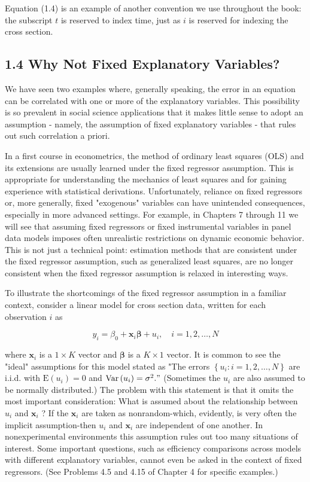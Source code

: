 \documentclass[10pt]{article}
\begin{document}
Equation (1.4) is an example of another convention we use throughout the book: the subscript $t$ is reserved to index time, just as $i$ is reserved for indexing the cross section.

\subsection*{1.4 Why Not Fixed Explanatory Variables?}
We have seen two examples where, generally speaking, the error in an equation can be correlated with one or more of the explanatory variables. This possibility is so prevalent in social science applications that it makes little sense to adopt an assumption - namely, the assumption of fixed explanatory variables - that rules out such correlation a priori.

In a first course in econometrics, the method of ordinary least squares (OLS) and its extensions are usually learned under the fixed regressor assumption. This is appropriate for understanding the mechanics of least squares and for gaining experience with statistical derivations. Unfortunately, reliance on fixed regressors or, more generally, fixed "exogenous" variables can have unintended consequences, especially in more advanced settings. For example, in Chapters 7 through 11 we will see that assuming fixed regressors or fixed instrumental variables in panel data models imposes often unrealistic restrictions on dynamic economic behavior. This is not just a technical point: estimation methods that are consistent under the fixed regressor assumption, such as generalized least squares, are no longer consistent when the fixed regressor assumption is relaxed in interesting ways.

To illustrate the shortcomings of the fixed regressor assumption in a familiar context, consider a linear model for cross section data, written for each observation $i$ as


\begin{equation*}
y_{i}=\beta_{0}+\mathbf{x}_{i} \boldsymbol{\beta}+u_{i}, \quad i=1,2, \ldots, N \tag{1.5}
\end{equation*}


where $\mathbf{x}_{i}$ is a $1 \times K$ vector and $\boldsymbol{\beta}$ is a $K \times 1$ vector. It is common to see the "ideal" assumptions for this model stated as "The errors $\left\{u_{i}: i=1,2, \ldots, N\right\}$ are i.i.d. with $\mathrm{E}\left(u_{i}\right)=0$ and $\operatorname{Var}\left(u_{i}\right)=\sigma^{2} . "$ (Sometimes the $u_{i}$ are also assumed to be normally distributed.) The problem with this statement is that it omits the most important consideration: What is assumed about the relationship between $u_{i}$ and $\mathbf{x}_{i}$ ? If the $\mathbf{x}_{i}$ are taken as nonrandom-which, evidently, is very often the implicit assumption-then $u_{i}$ and $\mathbf{x}_{i}$ are independent of one another. In nonexperimental environments this assumption rules out too many situations of interest. Some important questions, such as efficiency comparisons across models with different explanatory variables, cannot even be asked in the context of fixed regressors. (See Problems 4.5 and 4.15 of Chapter 4 for specific examples.)
\end{document}
